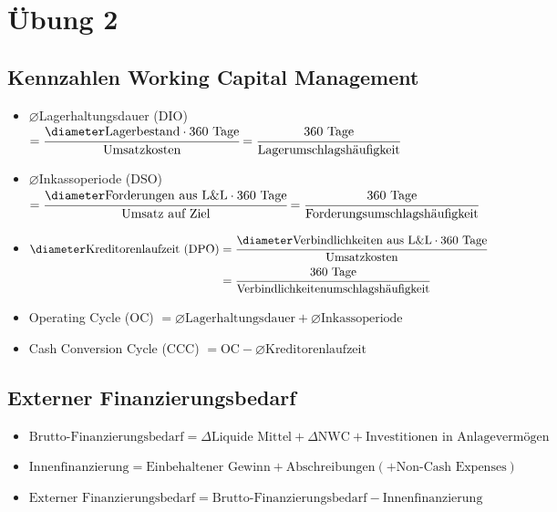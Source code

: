 \section{Übung 2}

\subsection{Kennzahlen Working Capital Management}
\begin{itemize}
	\item $\diameter$Lagerhaltungsdauer (DIO) $=\cfrac{\diameter\text{Lagerbestand}\cdot 360\text{ Tage}}{\text{Umsatzkosten}}=\cfrac{360\text{ Tage}}{\text{Lagerumschlagshäufigkeit}}$
	\item $\diameter$Inkassoperiode (DSO) $=\cfrac{\diameter\text{Forderungen aus L\&L}\cdot 360\text{ Tage}}{\text{Umsatz auf Ziel}}=\cfrac{360\text{ Tage}}{\text{Forderungsumschlagshäufigkeit}}$
	\item 
	$
		\begin{aligned}[t]
			\diameter\text{Kreditorenlaufzeit (DPO)} & = \cfrac{\diameter\text{Verbindlichkeiten aus L\&L}\cdot 360\text{ Tage}}{\text{Umsatzkosten}} \\
			& = \cfrac{360\text{ Tage}}{\text{Verbindlichkeitenumschlagshäufigkeit}}
		\end{aligned}$
	\item Operating Cycle (OC) $=\diameter\text{Lagerhaltungsdauer}+\diameter\text{Inkassoperiode}$
	\item Cash Conversion Cycle (CCC) $= \text{OC}-\diameter\text{Kreditorenlaufzeit}$
\end{itemize}

\subsection{Externer Finanzierungsbedarf}
\begin{itemize}
	\item $\text{Brutto-Finanzierungsbedarf}=\Delta\text{Liquide Mittel}+\Delta\text{NWC}+\text{Investitionen in Anlagevermögen}$
	\item $\text{Innenfinanzierung}=\text{Einbehaltener Gewinn}+\text{Abschreibungen}(+\text{Non-Cash Expenses})$
	\item $\text{Externer Finanzierungsbedarf}=\text{Brutto-Finanzierungsbedarf}-\text{Innenfinanzierung}$
\end{itemize}


